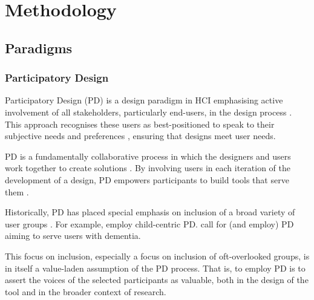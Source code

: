 

\chapter{\label{ch:methods}Methodology}

\minitoc

\section{Paradigms}
\subsection{Participatory Design}\label{ssec:participatory_design}
Participatory Design (PD) is a design paradigm in HCI emphasising active involvement of all stakeholders, particularly end-users, in the design process \cite{Hussain2014OverviewOV}. This approach recognises these users as best-positioned to speak to their subjective needs and preferences \cite{Hussain2014OverviewOV}, ensuring that designs meet user needs.

PD is a fundamentally collaborative process in which the designers and users work together to create solutions \cite{Tokranova2022ApplyingPD}. By involving users in each iteration of the development of a design, PD empowers participants to build tools that serve them \cite{Hussain2014OverviewOV}.

Historically, PD has placed special emphasis on inclusion of a broad variety of user groups \cite{Brankaert2019IntersectionsIH}. For example, \textcite{10.1145/3544549.3573821,10.1145/3544548.3580933,Chowdhury2023ReflectionsOO} employ child-centric PD. \textcite{Brankaert2019IntersectionsIH} call for (and employ) PD aiming to serve users with dementia.

This focus on inclusion, especially a focus on inclusion of oft-overlooked groups, is in itself a value-laden assumption of the PD process. That is, to employ PD is to assert the voices of the selected participants as valuable, both in the design of the tool and in the broader context of research.

